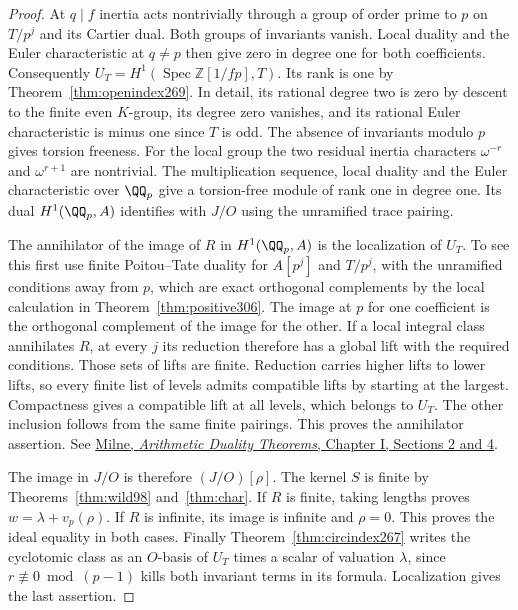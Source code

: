 \documentclass[a4paper,11pt]{article}
\theoremstyle{definition}
\theoremstyle{remark}
\newcommand{\ZZ}{\mathbb Z}\newcommand{\ord}{\operatorname{ord}}
\numberwithin{equation}{section}
\begin{document}
\begin{proof}
At \(q\mid f\) inertia acts nontrivially through a group of order
prime to \(p\) on \(T/p^j\) and its Cartier dual. Both groups of
invariants vanish. Local duality and the Euler characteristic at
\(q\ne p\) then give zero in degree one for both coefficients.
Consequently \(U_T=H^1(\operatorname{Spec}\ZZ[1/fp],T)\).
Its rank is one by Theorem~\ref{thm:openindex269}. In detail,
its rational degree two is zero by descent to the finite even
\(K\)-group, its degree zero vanishes, and its rational Euler
characteristic is minus one since \(T\) is odd. The absence of
invariants modulo \(p\) gives torsion freeness. For the local
group the two residual inertia characters \(\omega^{-r}\) and
\(\omega^{r+1}\) are nontrivial. The multiplication sequence,
local duality and the Euler characteristic over \(\QQ_p\) give a
torsion-free module of rank one in degree one. Its dual
\(H^1(\QQ_p,A)\) identifies with \(J/O\) using the unramified
trace pairing.

The annihilator of the image of \(R\) in \(H^1(\QQ_p,A)\) is
the localization of \(U_T\). To see this first use finite
Poitou--Tate duality for \(A[p^j]\) and \(T/p^j\), with the
unramified conditions away from \(p\), which are exact orthogonal
complements by the local calculation in Theorem~\ref{thm:positive306}.
The image at \(p\) for one coefficient is the orthogonal complement
of the image for the other. If a local integral class annihilates
\(R\), at every \(j\) its reduction therefore has a global lift
with the required conditions. Those sets of lifts are finite.
Reduction carries higher lifts to lower lifts, so every finite
list of levels admits compatible lifts by starting at the largest.
Compactness gives a compatible lift at all levels, which belongs
to \(U_T\). The other inclusion follows from the same finite
pairings. This proves the annihilator assertion. See
\href{https://www.jmilne.org/math/Books/ADTnot.pdf}{Milne,
\emph{Arithmetic Duality Theorems}, Chapter I, Sections 2 and 4}.

The image in \(J/O\) is therefore \((J/O)[\rho]\). The kernel
\(S\) is finite by Theorems~\ref{thm:wild98} and~\ref{thm:char}.
If \(R\) is finite, taking lengths proves \(w=\lambda+v_p(\rho)\).
If \(R\) is infinite, its image is infinite and \(\rho=0\).
This proves the ideal equality in both cases. Finally
Theorem~\ref{thm:circindex267} writes the cyclotomic class as
an \(O\)-basis of \(U_T\) times a scalar of valuation \(\lambda\),
since \(r\not\equiv0\bmod(p-1)\) kills both invariant terms
in its formula. Localization gives the last assertion.
\end{proof}
\end{document}
